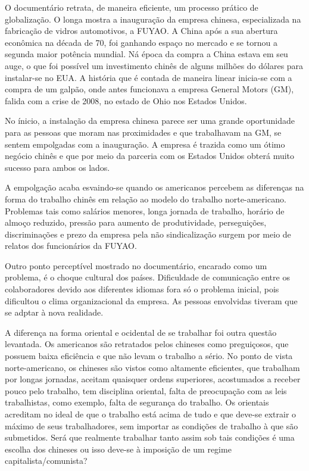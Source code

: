 \documentclass[12pt,a4paper,oneside]{article}
\begin{document}
\begin{onehalfspace}
O documentário retrata, de maneira eficiente, um processo prático de globalização. O longa mostra a inauguração da empresa chinesa, especializada na fabricação de vidros automotivos, a FUYAO. A China após a sua abertura econômica na década de 70, foi ganhando espaço no mercado e se tornou a segunda maior potência mundial. Ná época da compra a China estava em seu auge, o que foi possível um investimento chinês de alguns milhões do dólares para instalar-se no EUA.
A história que é contada de maneira linear inicia-se com a compra de um galpão, onde antes funcionava a empresa General Motors (GM), falida com a crise de 2008, no estado de Ohio nos Estados Unidos.

No ínicio, a instalação da empresa chinesa parece ser uma grande oportunidade para as pessoas que moram nas proximidades e que trabalhavam na GM, se sentem empolgadas com a inauguração. A empresa é trazida como um ótimo negócio chinês e que por meio da parceria com os Estados Unidos obterá muito sucesso para ambos os lados.

A empolgação acaba esvaindo-se quando os americanos percebem as diferenças na forma do trabalho chinês em relação ao modelo do trabalho norte-americano. Problemas tais como salários menores, longa jornada de trabalho, horário de almoço reduzido, pressão para aumento de produtividade, perseguições, discriminações e prezo da empresa pela não sindicalização surgem por meio de relatos dos funcionários da FUYAO.

Outro ponto perceptível mostrado no documentário, encarado como um problema, é o choque cultural dos países. Dificuldade de comunicação entre os colaboradores devido aos diferentes idiomas fora só o problema inicial, pois dificultou o clima organizacional da empresa. As pessoas envolvidas tiveram que se adptar à nova realidade.

A diferença na forma oriental e ocidental de se trabalhar foi outra questão levantada. Os americanos são retratados pelos chineses como preguiçosos, que possuem baixa eficiência e que não levam o trabalho a sério. No ponto de vista norte-americano, os chineses são vistos como altamente eficientes, que trabalham por longas jornadas, aceitam quaisquer ordens superiores, acostumados a receber pouco pelo trabalho, tem disciplina oriental, falta de preocupação com as leis trabalhistas, como exemplo, falta de segurança do trabalho. Os orientais acreditam no ideal de que o trabalho está acima de tudo e que deve-se extrair o máximo de seus trabalhadores, sem importar as condições de trabalho à que são submetidos. Será que realmente trabalhar tanto assim sob tais condições é uma escolha dos chineses ou isso deve-se à imposição de um regime  capitalista/comunista?


\end{onehalfspace}
\end{document}
